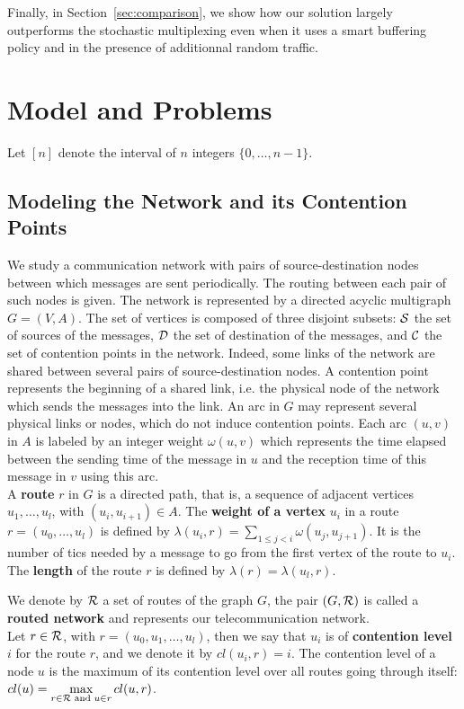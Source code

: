 \documentclass[10pt, conference, letterpaper]{IEEEtran}
\begin{document}
Finally, in Section~\ref{sec:comparison}, we show how our solution largely outperforms the stochastic multiplexing even when it uses a smart buffering policy and in the presence of additionnal random traffic.



\section{Model and Problems}\label{sec:def}

Let $[n]$ denote the interval of $n$ integers $\{0,\dots,n-1\}$.


\subsection{Modeling the Network and its Contention Points}

  We study a communication network with pairs of source-destination nodes between which messages are sent periodically. The routing between each pair of such nodes is given. The network is represented by a directed acyclic multigraph $G=(V,A)$. The set of vertices is composed of three disjoint subsets:  ${\cal S}$ the set of sources of the messages, ${\cal D}$ the set of destination of the messages, and ${\cal C}$ the set of contention points in the network. Indeed, some links of the network are shared between several pairs of source-destination nodes. A contention point represents the beginning of a shared link, i.e. the physical node of the network which sends the messages into the link. An arc in $G$ may represent several physical links or nodes, which do not induce contention points. Each arc  $(u,v)$ in $A$ is labeled by an integer weight $\omega(u,v)$ which represents the time elapsed between the sending time of the message in $u$ and the reception time of this message in $v$ using this arc. \\
  A {\bf route} $r$ in $G$ is a directed path, that is, a sequence of adjacent vertices $u_1, \ldots , u_{l}$, with $(u_i,u_{i+1}) \in A$.  The {\bf weight of a vertex} $u_i$ in a route $r=(u_0,\dots,u_l)$ is defined by $\lambda(u_i,r)= \sum\limits_{1 \leq j <i} \omega(u_j, u_{j+1})$. It is the number of tics needed by a message to go from the first vertex of the route to $u_i$. The \textbf{length} of the route $r$ is defined by $\lambda (r)= \lambda (u_l,r)$.

	We denote by ${\cal R}$ a set of routes of the graph $G$, the pair $(G,{\cal R})$ is called a \textbf{routed network} and represents our telecommunication network.\\
	Let $r \in {\cal R}$, with $r = (u_0,u_1,\dots,u_l)$, then we say that $u_i$ is of \textbf{contention level} $i$ for the route $r$, and we denote it by $cl(u_i,r) = i$. The contention level of a node $u$ is the maximum of its contention level over all routes going through itself: 
	$cl(u) = \max\limits_{r\in{\cal R} \text{ and } u \in r} cl(u,r)$.
\end{document}
